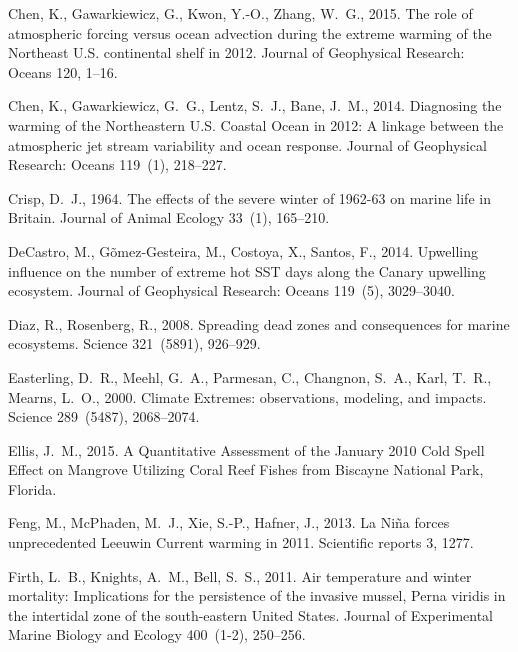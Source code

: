 \documentclass[a4paper,10pt,review]{elsarticle}
\begin{document}
\begin{thebibliography}{52}
Chen, K., Gawarkiewicz, G., Kwon, Y.-O., Zhang, W.~G., 2015. {The role of
  atmospheric forcing versus ocean advection during the extreme warming of the
  Northeast U.S. continental shelf in 2012}. Journal of Geophysical Research:
  Oceans 120, 1--16.

Chen, K., Gawarkiewicz, G.~G., Lentz, S.~J., Bane, J.~M., 2014. {Diagnosing the
  warming of the Northeastern U.S. Coastal Ocean in 2012: A linkage between the
  atmospheric jet stream variability and ocean response}. Journal of
  Geophysical Research: Oceans 119~(1), 218--227.

Crisp, D.~J., 1964. {The effects of the severe winter of 1962-63 on marine life
  in Britain}. Journal of Animal Ecology 33~(1), 165--210.

DeCastro, M., G{\~{o}}mez-Gesteira, M., Costoya, X., Santos, F., 2014.
  {Upwelling influence on the number of extreme hot SST days along the Canary
  upwelling ecosystem}. Journal of Geophysical Research: Oceans 119~(5),
  3029--3040.

Diaz, R., Rosenberg, R., 2008. {Spreading dead zones and consequences for
  marine ecosystems.} Science 321~(5891), 926--929.

Easterling, D.~R., Meehl, G.~A., Parmesan, C., Changnon, S.~A., Karl, T.~R.,
  Mearns, L.~O., 2000. {Climate Extremes: observations, modeling, and impacts}.
  Science 289~(5487), 2068--2074.

Ellis, J.~M., 2015. {A Quantitative Assessment of the January 2010 Cold Spell
  Effect on Mangrove Utilizing Coral Reef Fishes from Biscayne National Park,
  Florida}.

Feng, M., McPhaden, M.~J., Xie, S.-P., Hafner, J., 2013. {La Ni{\~{n}}a forces
  unprecedented Leeuwin Current warming in 2011.} Scientific reports 3, 1277.

Firth, L.~B., Knights, A.~M., Bell, S.~S., 2011. {Air temperature and winter
  mortality: Implications for the persistence of the invasive mussel, Perna
  viridis in the intertidal zone of the south-eastern United States}. Journal
  of Experimental Marine Biology and Ecology 400~(1-2), 250--256.


\end{thebibliography}
\end{document}
